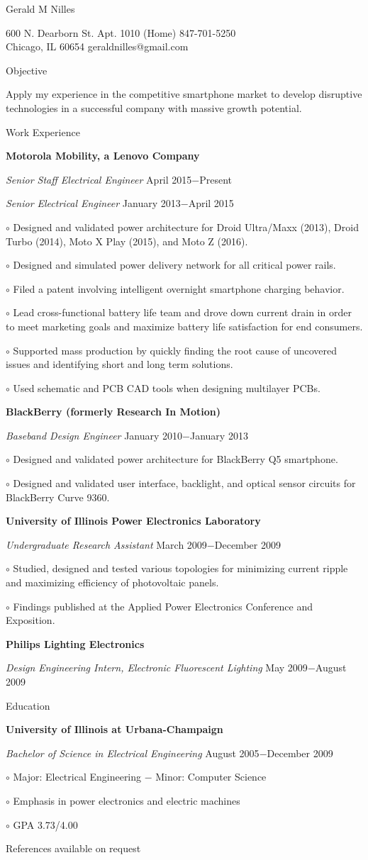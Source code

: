 \documentclass[12pt, letterpaper]{article}
\newcommand{\myname}[1]{{\begin{center} \LARGE #1 \end{center} \par }}
\newcommand{\myhead}[1]{{\vspace{2mm} \Large #1 \par}}
\newcommand{\objective}[1]{{\addtolength{\leftskip}{10mm} #1 \par }}
\newcommand{\company}[1]{{\vspace{1mm} \addtolength{\leftskip}{10mm} \textbf{#1} \par}}
\newcommand{\position}[2]{{\addtolength{\leftskip}{10mm} \emph{#1} \hfill #2 \par \vspace{1mm}}}
\newcommand{\skill}[1]{{  \vspace{0.3mm} \addtolength{\leftskip}{20mm} \setlength\parindent{-4mm} $\circ$ #1 \par}}
\begin{document}
\pagestyle{empty}
\raggedright

\myname{Gerald M Nilles}
600 N. Dearborn St. Apt. 1010 \hfill (Home) 847-701-5250 \\
Chicago, IL 60654   \hfill geraldnilles@gmail.com \\
\myhead{Objective}
    \objective{Apply my experience in the competitive smartphone market to develop disruptive technologies in a successful company with massive growth potential.}

\myhead{Work Experience}
    \company{Motorola Mobility, a Lenovo Company}
    \position{Senior Staff Electrical Engineer}{April 2015$-$Present}
    \position{Senior Electrical Engineer}{January 2013$-$April 2015}
        \skill{Designed and validated power architecture for Droid Ultra/Maxx (2013), Droid Turbo (2014), Moto X Play (2015), and Moto Z (2016).}
        \skill{Designed and simulated power delivery network for all critical power rails.}
	\skill{Filed a patent involving intelligent overnight smartphone charging behavior.}
        \skill{Lead cross-functional battery life team and drove down current drain in order to meet marketing goals and maximize battery life satisfaction for end consumers.}
	\skill{Supported mass production by quickly finding the root cause of uncovered issues and identifying short and long term solutions.}
        \skill{Used schematic and PCB CAD tools when designing multilayer PCBs.}

    \company{BlackBerry (formerly Research In Motion)}
    \position{Baseband Design Engineer}{January 2010$-$January 2013}
        \skill{Designed and validated power architecture for BlackBerry Q5 smartphone.}
        \skill{Designed and validated user interface, backlight, and optical sensor circuits for BlackBerry Curve 9360.}

    \company{University of Illinois Power Electronics Laboratory}
    \position{Undergraduate Research Assistant}{March 2009$-$December 2009}
        \skill{Studied, designed and tested various topologies for minimizing current ripple and maximizing efficiency of photovoltaic panels.}
	\skill{Findings published at the Applied Power Electronics Conference and Exposition.}

    \company{Philips Lighting Electronics} 
    \position{Design Engineering Intern, Electronic Fluorescent Lighting}{May 2009$-$August 2009}

\myhead{Education}
    \company{University of Illinois at Urbana-Champaign}
    \position{Bachelor of Science in Electrical Engineering}{August 2005$-$December 2009}
        \skill{Major: Electrical Engineering $-$ Minor: Computer Science}
        \skill{Emphasis in power electronics and electric machines}
	\skill{GPA 3.73/4.00}

\begin{center}
\small
References available on request
\end{center}
\end{document}
